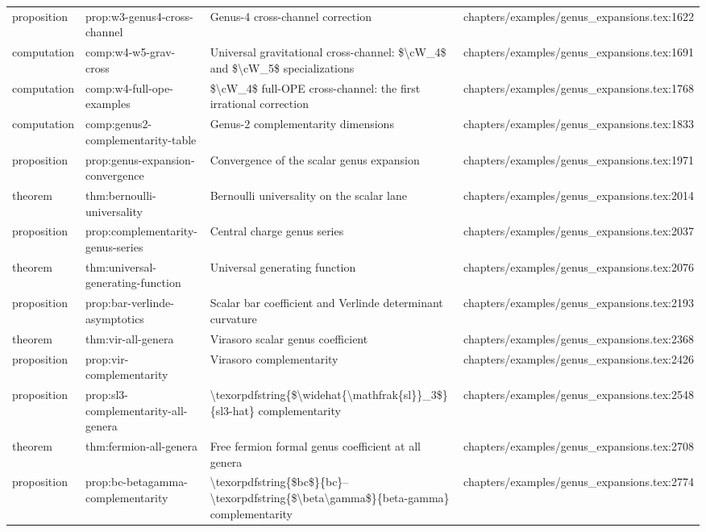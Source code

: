 \documentclass[11pt]{article}
\begin{document}
\begin{longtable}{L{0.10\textwidth}L{0.26\textwidth}L{0.42\textwidth}L{0.22\textwidth}}
proposition & prop:w3-genus4-cross-channel & Genus-4 cross-channel correction & chapters/examples/genus\_expansions.tex:1622\\
computation & comp:w4-w5-grav-cross & Universal gravitational cross-channel: \$\textbackslash{}cW\_4\$ and \$\textbackslash{}cW\_5\$ specializations & chapters/examples/genus\_expansions.tex:1691\\
computation & comp:w4-full-ope-examples & \$\textbackslash{}cW\_4\$ full-OPE cross-channel: the first irrational correction & chapters/examples/genus\_expansions.tex:1768\\
computation & comp:genus2-complementarity-table & Genus-2 complementarity dimensions & chapters/examples/genus\_expansions.tex:1833\\
proposition & prop:genus-expansion-convergence & Convergence of the scalar genus expansion & chapters/examples/genus\_expansions.tex:1971\\
theorem & thm:bernoulli-universality & Bernoulli universality on the scalar lane & chapters/examples/genus\_expansions.tex:2014\\
proposition & prop:complementarity-genus-series & Central charge genus series & chapters/examples/genus\_expansions.tex:2037\\
theorem & thm:universal-generating-function & Universal generating function & chapters/examples/genus\_expansions.tex:2076\\
proposition & prop:bar-verlinde-asymptotics & Scalar bar coefficient and Verlinde determinant curvature & chapters/examples/genus\_expansions.tex:2193\\
theorem & thm:vir-all-genera & Virasoro scalar genus coefficient & chapters/examples/genus\_expansions.tex:2368\\
proposition & prop:vir-complementarity & Virasoro complementarity & chapters/examples/genus\_expansions.tex:2426\\
proposition & prop:sl3-complementarity-all-genera & \textbackslash{}texorpdfstring\{\$\textbackslash{}widehat\{\textbackslash{}mathfrak\{sl\}\}\_3\$\}\{sl3-hat\} complementarity & chapters/examples/genus\_expansions.tex:2548\\
theorem & thm:fermion-all-genera & Free fermion formal genus coefficient at all genera & chapters/examples/genus\_expansions.tex:2708\\
proposition & prop:bc-betagamma-complementarity & \textbackslash{}texorpdfstring\{\$bc\$\}\{bc\}--\textbackslash{}texorpdfstring\{\$\textbackslash{}beta\textbackslash{}gamma\$\}\{beta-gamma\} complementarity & chapters/examples/genus\_expansions.tex:2774\\

\end{longtable}
\end{document}
